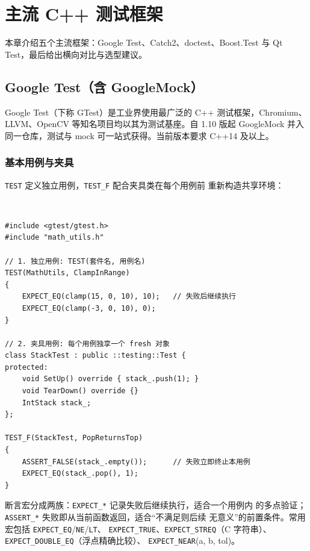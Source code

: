 \documentclass[12pt,a4paper,fontset=fandol]{ctexbook}
\newcommand{\cpplabel}{%
  \begin{tcolorbox}[enhanced,colback=cppheadbg,colframe=cppheadbg,
    arc=1mm,boxrule=0mm,left=6pt,right=6pt,top=2pt,bottom=2pt,
    halign=left,oversize]
    \textcolor{white}{\small\bfseries C++}
  \end{tcolorbox}\vspace{-4pt}}
\begin{document}
\chapter{主流 C++ 测试框架}

本章介绍五个主流框架：Google Test、Catch2、doctest、Boost.Test 与
Qt Test，最后给出横向对比与选型建议。

\section{Google Test（含 GoogleMock）}

Google Test（下称 GTest）是工业界使用最广泛的 C++ 测试框架，Chromium、
LLVM、OpenCV 等知名项目均以其为测试基座。自 1.10 版起 GoogleMock 并入
同一仓库，测试与 mock 可一站式获得。当前版本要求 C++14 及以上。

\subsection{基本用例与夹具}

\texttt{TEST} 定义独立用例，\texttt{TEST\_F} 配合夹具类在每个用例前
重新构造共享环境：

\cpplabel
\begin{lstlisting}
#include <gtest/gtest.h>
#include "math_utils.h"

// 1. 独立用例: TEST(套件名, 用例名)
TEST(MathUtils, ClampInRange)
{
    EXPECT_EQ(clamp(15, 0, 10), 10);   // 失败后继续执行
    EXPECT_EQ(clamp(-3, 0, 10), 0);
}

// 2. 夹具用例: 每个用例独享一个 fresh 对象
class StackTest : public ::testing::Test {
protected:
    void SetUp() override { stack_.push(1); }
    void TearDown() override {}
    IntStack stack_;
};

TEST_F(StackTest, PopReturnsTop)
{
    ASSERT_FALSE(stack_.empty());      // 失败立即终止本用例
    EXPECT_EQ(stack_.pop(), 1);
}
\end{lstlisting}

断言宏分成两族：\texttt{EXPECT\_*} 记录失败后继续执行，适合一个用例内
的多点验证；\texttt{ASSERT\_*} 失败即从当前函数返回，适合“不满足则后续
无意义”的前置条件。常用宏包括 \texttt{EXPECT\_EQ}/\allowbreak{}\texttt{NE}/\allowbreak{}\texttt{LT}、
\texttt{EXPECT\_TRUE}、\texttt{EXPECT\_STREQ}（C 字符串）、
\texttt{EXPECT\_DOUBLE\_EQ}（浮点精确比较）、
\texttt{EXPECT\_NEAR}(a, b, tol)。
\end{document}
